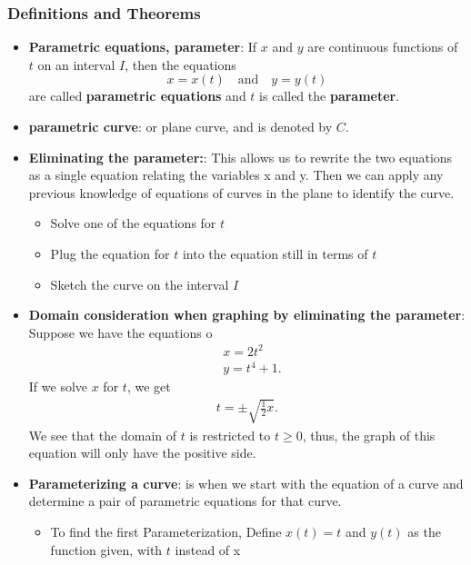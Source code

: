 \documentclass{report}
\begin{document}
    \subsubsection{Definitions and Theorems} 
    \begin{itemize}
        \item \textbf{Parametric equations, parameter}: 
            If \( x \) and \( y \) are continuous functions of \( t \) on an interval \( I \), then the equations
            \[ x = x(t) \quad \text{and} \quad y = y(t) \]
            are called \textbf{parametric equations} and \( t \) is called the \textbf{parameter}. 
        \item \textbf{parametric curve}: or plane curve, and is denoted by \( C \).
        \item \textbf{Eliminating the parameter:}: This allows us to rewrite the two equations as a single equation relating the variables x and y. Then we can apply any previous knowledge of equations of curves in the plane to identify the curve. 
            \begin{itemize}
                \item Solve one of the equations for $t$
                \item Plug the equation for $t$ into the equation still in terms of $t$
                \item Sketch the curve on the interval $I$
            \end{itemize}
        \item \textbf{Domain consideration when graphing by eliminating the parameter}: Suppose we have the equations 
            o\begin{align*}
                &x = 2t^{2} \\
                &y = t^{4} + 1
            .\end{align*}
            If we solve $x$ for $t$, we get 
            \begin{align*}
                 t = \pm \sqrt{\frac{1}{2}x}
            .\end{align*}
            We see that the domain of $t$ is restricted to  $t \geq 0$, thus, the graph of this equation will only have the positive side.
        \item \textbf{Parameterizing a curve}: is when we start with the equation of a curve and determine a pair of parametric equations for that curve.
            \begin{itemize}
                \item To find the first Parameterization, Define $x(t) = t $ and $y(t)$ as the function given, with $t$ instead of x 

\end{itemize}
\end{itemize}
\end{document}

